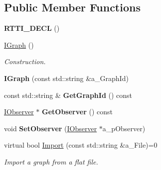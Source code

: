 \subsection*{Public Member Functions}
\begin{DoxyCompactItemize}
\item 
\mbox{\label{class_i_graph_a10fdd6bb1da2be1304b29e52b50288c7}} 
{\bfseries R\+T\+T\+I\+\_\+\+D\+E\+CL} ()
\item 
\mbox{\label{class_i_graph_abb0b356a456772d975c849a4c9394194}} 
\hyperlink{class_i_graph_abb0b356a456772d975c849a4c9394194}{I\+Graph} ()
\begin{DoxyCompactList}\small\item\em Construction. \end{DoxyCompactList}\item 
\mbox{\label{class_i_graph_a23fa71aa1e1fbf14e5909e0bf53b01bb}} 
{\bfseries I\+Graph} (const std\+::string \&a\+\_\+\+Graph\+Id)
\item 
\mbox{\label{class_i_graph_a1cb1988e5344b23ed333abde73499d54}} 
const std\+::string \& {\bfseries Get\+Graph\+Id} () const
\item 
\mbox{\label{class_i_graph_a2c70971a4c0ed9f62bb0568451ad4001}} 
\hyperlink{class_i_graph_1_1_i_observer}{I\+Observer} $\ast$ {\bfseries Get\+Observer} () const
\item 
\mbox{\label{class_i_graph_ad7aa9db31b577c77ccd1098b6dd228aa}} 
void {\bfseries Set\+Observer} (\hyperlink{class_i_graph_1_1_i_observer}{I\+Observer} $\ast$a\+\_\+p\+Observer)
\item 
\mbox{\label{class_i_graph_a282c63adf095748e411ac312238826be}} 
virtual bool \hyperlink{class_i_graph_a282c63adf095748e411ac312238826be}{Import} (const std\+::string \&a\+\_\+\+File)=0
\begin{DoxyCompactList}\small\item\em Import a graph from a flat file. \end{DoxyCompactList}\item 
\mbox{\label{class_i_graph_a6cff05100861eb3b5105437c8925d5ef}} 

\end{DoxyCompactItemize}

